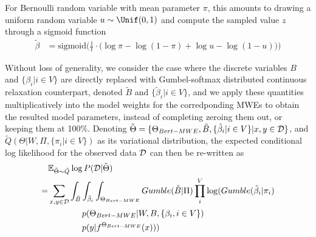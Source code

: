 For Bernoulli random variable with mean parameter $\pi$, this amounts to drawing a uniform random variable  $u \sim \Unif (0, 1)$ and compute the sampled value $z$
 through a sigmoid function \cite{gal2017concrete}
\begin{align}
\tilde{\beta} &= \text{sigmoid} \bigg(
\frac{1}{t} \cdot \big(
\log \pi
- \log (1 - \pi)
+ \log u
- \log (1 - u)
\big)
\bigg) \label{eq:gumbel-sample}
\end{align}






Without loss of generality, we consider the case where the discrete variables $B$ and $\{
\beta_i | i \in V\}$ are directly replaced with Gumbel-softmax distributed continuous relaxation counterpart, denoted $\tilde{B}$ and $ \{ \tilde{\beta}_i  | i \in V\}$, and 
we apply these quantities multiplicatively into the model weights for the corredponding MWEs to obtain the resulted model parameters, 
instead of completing zeroing them out, or keeping them at 100\%.
Denoting $\tilde{\Theta} = \{\Theta_{Bert-MWE}, \tilde{B}, \{\tilde{\beta}_i | i \in V\} \vert x,y \in \mathcal{D} \}$, and $ \tilde{Q} (\Theta | W, \Pi, \{\pi_i | i \in V\})$ as its variational distribution, the expected conditional log likelihood for the observed data $\mathcal{D}$ can then be re-written as
\begin{align}
& \mathbb{E}_{\tilde{\Theta} \sim \tilde{Q}} \log P (\mathcalD | \tilde{\Theta}) \nonumber\\ 
= & \sum_{x, y \in \mathcalD} \int_{\tilde{B}} \int_{\tilde{\beta}_i}\int_{\Theta_{Bert-MWE}} Gumble(\tilde{B} | \Pi) \prod_i^{V} \log ( Gumble(\tilde{\beta}_i | \pi_i) \nonumber\\ 
& \quad \quad \quad \quad p(\Theta_{Bert-MWE} \vert W, B, \{\beta_i, i \in V\}) \nonumber\\ 
& \quad \quad \quad \quad p(y \vert f^{\Theta_{Bert-MWE}}(x)) )
\label{eq:exp-gumble}
\end{align}

